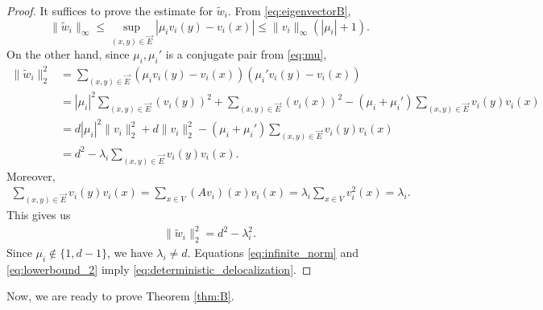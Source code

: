 \documentclass[11pt,reqno]{amsart}
\theoremstyle{definition}
\begin{document}
\begin{proof}
It suffices to prove the estimate for $\tilde w_i$.    From \eqref{eq:eigenvectorB},
\begin{equation}\label{eq:infinite_norm}
    \| \tilde w_i \|_{\infty} \leq \sup_{(x,y)\in \overrightarrow{E}} |\mu_i v_i(y) - v_i(x)| 
    \leq \| v_i \|_{\infty} ( |\mu_i|  +1 ).
\end{equation}
     On the other hand, since $\mu_i,\mu_i'$ is a conjugate pair from \eqref{eq:mu},
     \begin{align}
    \| \tilde w_i \|_2^2 
    &= \sum_{(x,y)\in \overrightarrow{E}} ( \mu_i v_i(y) - v_i(x))(\mu_i' v_i(y)-v_i(x)) \\
    &= |\mu_i|^2 \sum_{(x,y)\in \overrightarrow{E}} (v_i(y))^2 + \sum_{(x,y)\in \overrightarrow{E}} (v_i(x))^2 - (\mu_i+\mu_i') \sum_{(x,y)\in \overrightarrow{E}} v_i(y)v_i(x)\\
    &= d|\mu_i|^2 \|v_i\|_2^2+ d\|v_i\|_2^2 -(\mu_i+\mu_i') \sum_{(x,y)\in \overrightarrow{E}} v_i(y)v_i(x)\\
    &=d^2-\lambda_i \sum_{(x,y)\in \overrightarrow{E}} v_i(y)v_i(x).
\end{align}
Moreover, 
\begin{align}
    \sum_{(x,y)\in \overrightarrow{E}} v_i(y)v_i(x)=\sum_{x\in V} (Av_i)(x) v_i(x)=\lambda_i\sum_{x\in V}  v_i^2(x)=\lambda_i.
\end{align}
This gives us 
\begin{align}\label{eq:lowerbound_2}
    \| \tilde w_i \|_2^2=d^2-\lambda_i^2.
\end{align}
Since $\mu_i\notin\{1,d-1\}$, we have $\lambda_i\not=d$.
Equations \eqref{eq:infinite_norm} and \eqref{eq:lowerbound_2} imply \eqref{eq:deterministic_delocalization}.
\end{proof}

Now, we are ready to prove Theorem \ref{thm:B}. 
\end{document}
